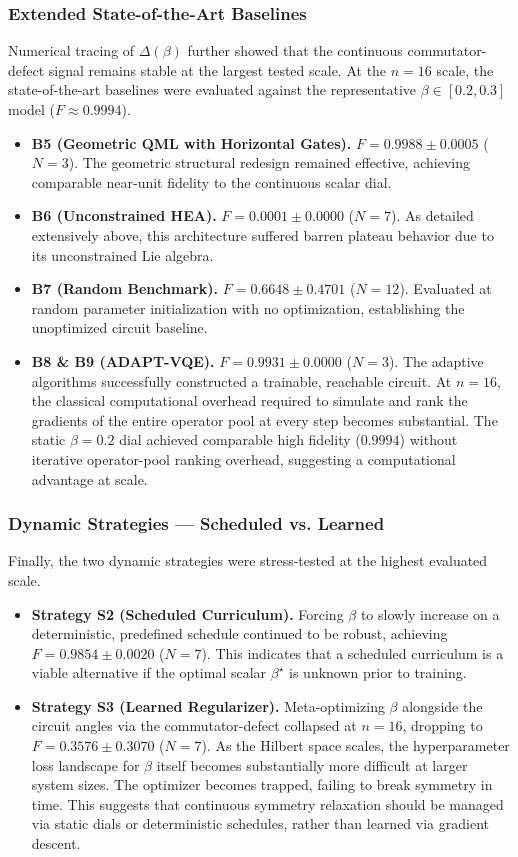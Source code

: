 \documentclass[pdflatex,sn-mathphys-num]{sn-jnl}
\theoremstyle{thmstyleone}
\theoremstyle{thmstyletwo}
\theoremstyle{thmstylethree}
\begin{document}
\subsubsection{Extended State-of-the-Art Baselines}
Numerical tracing of $\Delta(\beta)$ further showed that the continuous commutator-defect signal remains stable at the largest tested scale.
At the $n=16$ scale, the state-of-the-art baselines were evaluated against the representative $\beta \in [0.2, 0.3]$ model ($F \approx 0.9994$).
\begin{itemize}
    \item \textbf{B5 (Geometric QML with Horizontal Gates).} $F=0.9988 \pm 0.0005$ ($N=3$). The geometric structural redesign remained effective, achieving comparable near-unit fidelity to the continuous scalar dial.
    \item \textbf{B6 (Unconstrained HEA).} $F=0.0001 \pm 0.0000$ ($N=7$). As detailed extensively above, this architecture suffered barren plateau behavior due to its unconstrained Lie algebra.
    \item \textbf{B7 (Random Benchmark).} $F=0.6648 \pm 0.4701$ ($N=12$). Evaluated at random parameter initialization with no optimization, establishing the unoptimized circuit baseline.
    \item \textbf{B8 \& B9 (ADAPT-VQE).} $F=0.9931 \pm 0.0000$ ($N=3$). The adaptive algorithms successfully constructed a trainable, reachable circuit. At $n=16$, the classical computational overhead required to simulate and rank the gradients of the entire operator pool at every step becomes substantial. The static $\beta=0.2$ dial achieved comparable high fidelity ($0.9994$) without iterative operator-pool ranking overhead, suggesting a computational advantage at scale.
\end{itemize}

\subsubsection{Dynamic Strategies --- Scheduled vs. Learned}
Finally, the two dynamic strategies were stress-tested at the highest evaluated scale.
\begin{itemize}
    \item \textbf{Strategy S2 (Scheduled Curriculum).} Forcing $\beta$ to slowly increase on a deterministic, predefined schedule continued to be robust, achieving $F=0.9854 \pm 0.0020$ ($N=7$). This indicates that a scheduled curriculum is a viable alternative if the optimal scalar $\beta^\star$ is unknown prior to training.
    \item \textbf{Strategy S3 (Learned Regularizer).} Meta-optimizing $\beta$ alongside the circuit angles via the commutator-defect collapsed at $n=16$, dropping to $F=0.3576 \pm 0.3070$ ($N=7$). As the Hilbert space scales, the hyperparameter loss landscape for $\beta$ itself becomes substantially more difficult at larger system sizes. The optimizer becomes trapped, failing to break symmetry in time. This suggests that continuous symmetry relaxation should be managed via static dials or deterministic schedules, rather than learned via gradient descent.
\end{itemize}
\end{document}
